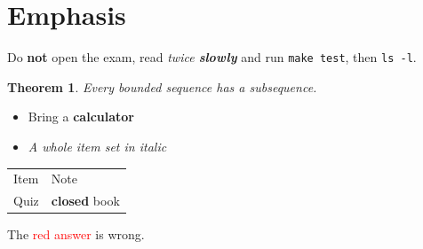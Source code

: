 \documentclass{article}
\newtheorem{thm}{Theorem}
\begin{document}
\section{Emphasis}
Do \textbf{not} open the exam, read \emph{twice \textbf{slowly}} and run \texttt{make test}, then \verb|ls -l|.

\begin{thm}
Every bounded \emph{sequence} has a subsequence.
\end{thm}

\begin{itemize}
\item Bring a \textbf{calculator}
\item \emph{A whole item set in italic}
\end{itemize}

\begin{tabular}{ll}
Item & Note\\
Quiz & \textbf{closed} book\\
\end{tabular}

The \textcolor{red}{red answer} is wrong.
\end{document}

